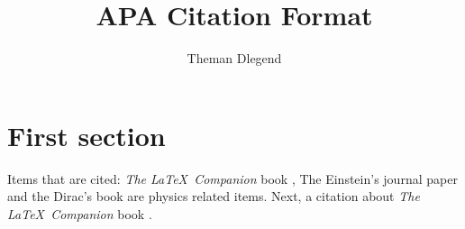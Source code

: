 \documentclass{article}
\title{APA Citation Format}
\author{Theman Dlegend}
\begin{document}
\maketitle
\section{First section}

Items that are cited: \textit{The \LaTeX\ Companion} book \cite{latexcompanion}, The Einstein's journal paper \cite{einstein} and the Dirac's book \cite{dirac} are physics related items. Next, a citation about \textit{The \LaTeX\ Companion} book \cite{latexcompanion}.

\medskip

\printbibliography
\end{document}
